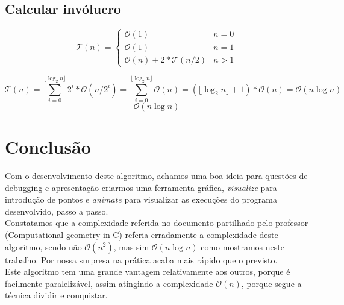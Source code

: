 \documentclass[11pt]{article}
\begin{document}
\subsection{Calcular invólucro}
$$
    \mathcal{T}(n) = 
        \begin{cases}
            \mathcal{O}(1)                      & n = 0\\
            \mathcal{O}(1)                      & n = 1\\
            \mathcal{O}(n) + 2*\mathcal{T}(n/2) & n > 1
        \end{cases}
$$

$$
    \mathcal{T}(n) = \sum_{i=0}^{\lfloor\log_{2}n\rfloor} 2^i*\mathcal{O}(n/2^i)
    = \sum_{i=0}^{\lfloor\log_{2}n\rfloor} \mathcal{O}(n)
    = (\lfloor\log_{2}n\rfloor + 1)*\mathcal{O}(n)
    = \mathcal{O}(n\log{n})
$$
$$
    \mathcal{O}(n\log{n})
$$


\section{Conclusão}
Com o desenvolvimento deste algoritmo, achamos uma boa ideia 
para questões de debugging e apresentação criarmos uma ferramenta
gráfica, \textit{visualize} para introdução de pontos e \textit{animate}
para visualizar as execuções do programa desenvolvido, passo a passo.\\
Constatamos que a complexidade referida no documento partilhado 
pelo professor (Computational geometry in C) referia erradamente 
a complexidade deste algoritmo, sendo não $\mathcal{O}(n^2)$, mas sim
$\mathcal{O}(n\log{n})$ como mostramos neste trabalho. Por nossa surpresa
na prática acaba mais rápido que o previsto.\\
Este algoritmo tem uma grande vantagem relativamente aos outros,
porque é facilmente paralelizável, assim atingindo a 
complexidade $\mathcal{O}(n)$, porque segue a técnica dividir e conquistar.
\end{document}
